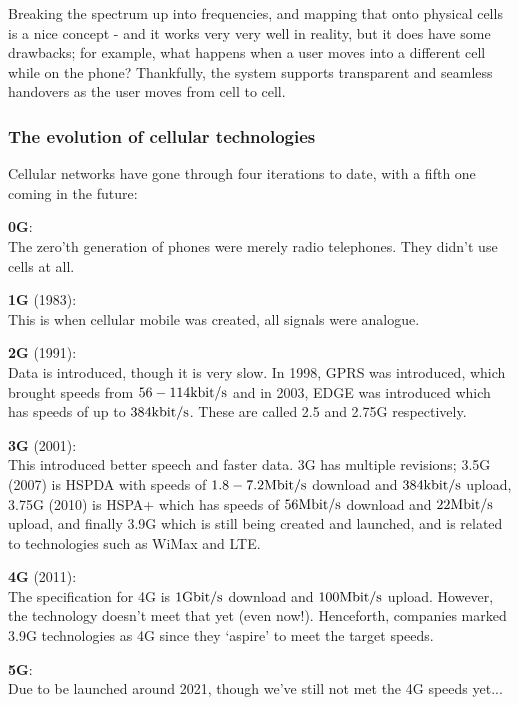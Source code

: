 Breaking the spectrum up into frequencies, and mapping that onto physical cells
is a nice concept - and it works very very well in reality, but it does have
some drawbacks; for example, what happens when a user moves into a different
cell while on the phone? Thankfully, the system supports transparent and
seamless handovers as the user moves from cell to cell.

\subsubsection{The evolution of cellular technologies}

Cellular networks have gone through four iterations to date, with a fifth one
coming in the future:

\begin{description}
  \item \textbf{0G}:\\
  	The zero'th generation of phones were merely radio telephones. They didn't
  	use cells at all.
  \item \textbf{1G} (1983):\\
  	This is when cellular mobile was created, all signals were analogue.
  \item \textbf{2G} (1991):\\
  	Data is introduced, though it is very slow. In 1998, GPRS was introduced,
  	which brought speeds from $56-114\si{\kilo\bit\per\second}$ and in 2003,
  	EDGE was introduced which has speeds of up to
  	$384\si{\kilo\bit\per\second}$. These are called 2.5 and 2.75G respectively.
  \item \textbf{3G} (2001):\\
  	This introduced better speech and faster data. 3G has multiple revisions; 
  	3.5G (2007) is HSPDA with speeds of $1.8-7.2\si{\mega\bit\per\second}$
  	download and $384\si{\kilo\bit\per\second}$ upload, 3.75G (2010) is HSPA+
  	which has speeds of $56\si{\mega\bit\per\second}$ download and 
  	$22\si{\mega\bit\per\second}$ upload, and finally 3.9G which is still being
  	created and launched, and is related to technologies such as WiMax and LTE.
  \item \textbf{4G} (2011):\\
  	The specification for 4G is $1\si{\giga\bit\per\second}$ download and 
  	$100\si{\mega\bit\per\second}$ upload. However, the technology doesn't meet
  	that yet (even now!). Henceforth, companies marked 3.9G technologies as 4G
  	since they `aspire' to meet the target speeds.
  \item \textbf{5G}:\\
  	Due to be launched around 2021, though we've still not met the 4G speeds
  	yet...
\end{description}

